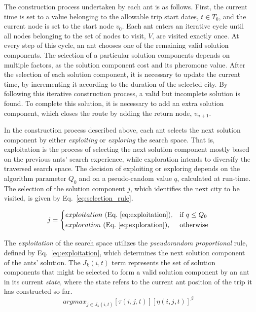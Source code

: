 The construction process undertaken by each ant is as follows. First, the current time is set to a value belonging to the allowable trip start dates, $t \in T_0$, and the current node is set to the start node $v_0$. Each ant enters an iterative cycle until all nodes belonging to the set of nodes to visit, $V$, are visited exactly once. At every step of this cycle, an ant chooses one of the remaining valid solution components. The selection of a particular solution components depends on multiple factors, as the solution component cost and its pheromone value. After the selection of each solution component, it is necessary to update the current time, by incrementing it  according to the duration of the selected city. By following this iterative construction process, a valid but incomplete solution is found. To complete this solution, it is necessary to add an extra solution component, which closes the route by adding the return node, $v_{n+1}$.

In the construction process described above, each ant selects the next solution component by either \textit{exploiting} or \textit{exploring} the search space. That is, exploitation is the process of selecting the next solution component mostly based on the previous ants' search experience, while exploration intends to diversify the traversed search space. The decision of exploiting or exploring depends on the algorithm parameter $Q_0$ and on a pseudo-random value $q$, calculated at run-time. The selection of the solution component $j$, which identifies the next city to be visited, is given by Eq.~\ref{eq:selection_rule}. 

\begin{equation}
  \label{eq:selection_rule}
  j =  \left \{
    \begin{aligned}
      & exploitation \ (\text{Eq.} \ \ref{eq:exploitation}) , && \text{if}\ q \leq Q_0 \\
      & exploration \ (\text{Eq.} \ \ref{eq:exploration}), && \text{otherwise}
    \end{aligned} \right. 
\end{equation}

The \textit{exploitation} of the search space utilizes the \textit{pseudorandom proportional} rule, defined by Eq.~\ref{eq:exploitation}, which determines the next solution component of the ants' solution. The $J_k(i,t)$ term represents the set of solution components that might be selected to form a valid solution component by an ant in its current \textit{state}, where the state refers to the current ant position of the trip it has constructed so far.
\begin{equation}
  \label{eq:exploitation}
    arg max_{j \in J_k(i,t)} {[\tau(i,j,t)][\eta(i,j,t)]^\beta}
\end{equation}

